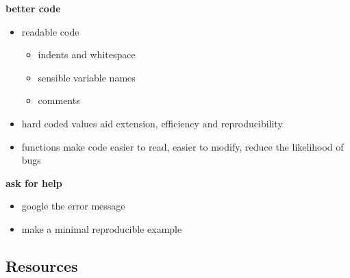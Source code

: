 \documentclass[
]{book}
\providecommand{\tightlist}{%
  \setlength{\itemsep}{0pt}\setlength{\parskip}{0pt}}
\begin{document}
\textbf{better code}

\begin{itemize}
\tightlist
\item
  readable code

  \begin{itemize}
  \tightlist
  \item
    indents and whitespace
  \item
    sensible variable names
  \item
    comments
  \end{itemize}
\item
  hard coded values aid extension, efficiency and reproducibility
\item
  functions make code easier to read, easier to modify, reduce the likelihood of bugs
\end{itemize}

\textbf{ask for help}

\begin{itemize}
\tightlist
\item
  google the error message
\item
  make a minimal reproducible example
\end{itemize}

\hypertarget{resources-5}{%
\subsection{Resources}\label{resources-5}}
\end{document}
